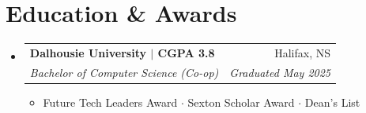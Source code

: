 \documentclass[letterpaper,11pt]{article}
\makeatletter
\newcommand{\resumeItem}[1]{
  \item\small{
    {#1 \vspace{-2pt}}
  }
}
\newcommand{\resumeSubheading}[4]{
  \vspace{-2pt}\item
    \begin{tabular*}{0.97\textwidth}[t]{l@{\extracolsep{\fill}}r}
      \textbf{#1} & #2 \\
      \textit{\small#3} & \textit{\small #4} \\
    \end{tabular*}\vspace{-7pt}
}
\newcommand{\resumeSubHeadingListStart}{\begin{itemize}[leftmargin=0.15in, label={}]}
\newcommand{\resumeSubHeadingListEnd}{\end{itemize}}
\newcommand{\resumeItemListStart}{\begin{itemize}}
\newcommand{\resumeItemListEnd}{\end{itemize}\vspace{-5pt}}
\makeatother
\begin{document}
\section{Education \& Awards}
  \resumeSubHeadingListStart
    \resumeSubheading
      {Dalhousie University $|$ CGPA 3.8}{Halifax, NS}
      {Bachelor of Computer Science (Co-op)}{Graduated May 2025}
      \resumeItemListStart
        \resumeItem{Future Tech Leaders Award $\cdot$ Sexton Scholar Award $\cdot$ Dean's List}
      \resumeItemListEnd
  \resumeSubHeadingListEnd
\end{document}
